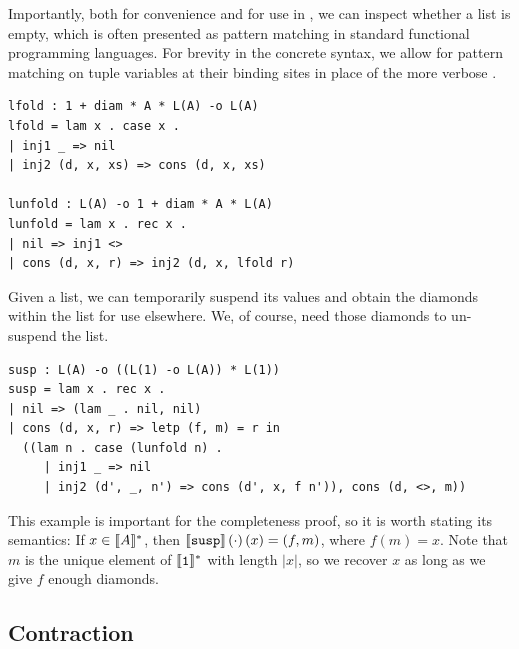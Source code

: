 \begin{example}
\label{example:list-case}
Importantly, both for convenience and for use in , we can inspect whether a list is empty, which is often presented as pattern matching in standard functional programming languages. For brevity in the concrete syntax, we allow for pattern matching on tuple variables at their binding sites in place of the more verbose .\smallskip
\begin{lstlisting}
lfold : 1 + diam * A * L(A) -o L(A)
lfold = lam x . case x .
| inj1 _ => nil
| inj2 (d, x, xs) => cons (d, x, xs)

lunfold : L(A) -o 1 + diam * A * L(A)
lunfold = lam x . rec x .
| nil => inj1 <>
| cons (d, x, r) => inj2 (d, x, lfold r)
\end{lstlisting}
\end{example}

\begin{example}
\label{example:susp}
\enlargethispage{.5\baselineskip}
Given a list, we can temporarily suspend its values and obtain the diamonds within the list for use elsewhere. We, of course, need those diamonds to un-suspend the list.
\begin{lstlisting}
susp : L(A) -o ((L(1) -o L(A)) * L(1))
susp = lam x . rec x .
| nil => (lam _ . nil, nil)
| cons (d, x, r) => letp (f, m) = r in
  ((lam n . case (lunfold n) .
     | inj1 _ => nil
     | inj2 (d', _, n') => cons (d', x, f n')), cons (d, <>, m))
\end{lstlisting}
This example is important for the completeness proof, so it is worth stating its semantics: If $x \in \llbracket A \rrbracket^*$, then ${\llbracket \mathtt{susp} \rrbracket}\left(\cdot\right)(x) = (f, m)$, where $f(m) = x$. Note that $m$ is the unique element of $\tpsem{\tpunit}^*$ with length $|x|$, so we recover $x$ as long as we give $f$ enough diamonds.
\end{example}



\subsection{Contraction}

